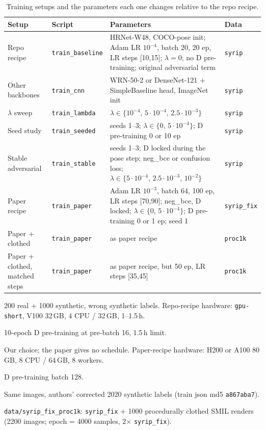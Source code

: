\documentclass[10pt]{article}
\begin{document}
\begin{table}[h]\centering\small
\begin{threeparttable}
\caption{Training setups and the parameters each one changes relative to the repo recipe.}
\label{tab:setups}
\begin{tabularx}{\linewidth}{l l X l}
\toprule
Setup & Script & Parameters & Data \\
\midrule
Repo recipe & \texttt{train\_baseline} & HRNet-W48, COCO-pose init; Adam LR $10^{-4}$, batch 20, 20 ep, LR steps [10,15]; $\lambda=0$; no D pre-training; original adversarial term & \texttt{syrip}\tnote{a} \\
Other backbones & \texttt{train\_cnn} & WRN-50-2 or DenseNet-121 + SimpleBaseline head, ImageNet init & \texttt{syrip} \\
$\lambda$ sweep & \texttt{train\_lambda} & $\lambda \in \{10^{-4},\, 5\cdot10^{-4},\, 2.5\cdot10^{-3}\}$ & \texttt{syrip} \\
Seed study & \texttt{train\_seeded} & seeds 1--3; $\lambda \in \{0,\, 5\cdot10^{-4}\}$; D pre-training 0 or 10 ep\tnote{b} & \texttt{syrip} \\
Stable adversarial & \texttt{train\_stable} & seeds 1--3; D locked during the pose step; neg\_bce or confusion loss; $\lambda \in \{5\cdot10^{-4},\, 2.5\cdot10^{-3},\, 10^{-2}\}$ & \texttt{syrip} \\
\midrule
Paper recipe & \texttt{train\_paper} & Adam LR $10^{-3}$, batch 64, 100 ep, LR steps [70,90]\tnote{c}; neg\_bce, D locked; $\lambda \in \{0,\, 5\cdot10^{-4}\}$; D pre-training 0 or 1 ep\tnote{d}; seed 1 & \texttt{syrip\_fix}\tnote{e} \\
Paper + clothed & \texttt{train\_paper} & as paper recipe & \texttt{proc1k}\tnote{f} \\
Paper + clothed, matched steps & \texttt{train\_paper} & as paper recipe, but 50 ep, LR steps [35,45] & \texttt{proc1k} \\
\bottomrule
\end{tabularx}
\begin{tablenotes}\footnotesize
\item[a] 200 real + 1000 synthetic, wrong synthetic labels. Repo-recipe hardware: \texttt{gpu-short}, V100 32\,GB, 4 CPU / 32\,GB, 1--1.5\,h.
\item[b] 10-epoch D pre-training at pre-batch 16, 1.5\,h limit.
\item[c] Our choice; the paper gives no schedule. Paper-recipe hardware: H200 or A100 80\,GB, 8 CPU / 64\,GB, 8 workers.
\item[d] D pre-training batch 128.
\item[e] Same images, authors' corrected 2020 synthetic labels (train json md5 \texttt{a867aba7}).
\item[f] \texttt{data/syrip\_fix\_proc1k}: \texttt{syrip\_fix} + 1000 procedurally clothed SMIL renders (2200 images; epoch = 4000 samples, 2$\times$ \texttt{syrip\_fix}).
\end{tablenotes}
\end{threeparttable}
\end{table}
\end{document}

